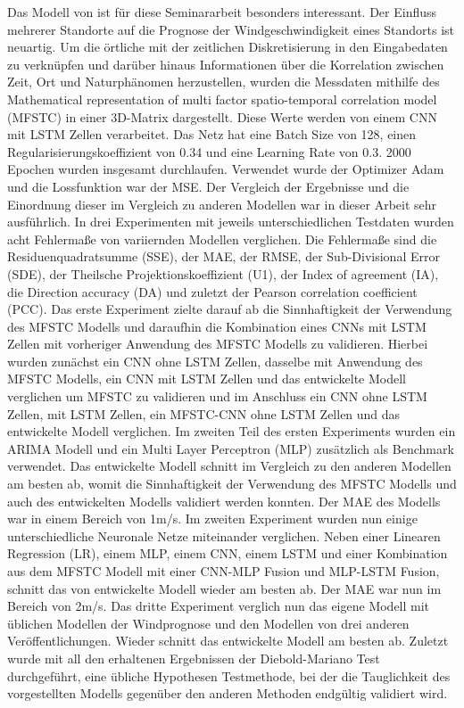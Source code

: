 \documentclass[
12pt, %
toc=listofnumbered, %
toc=chapterentrydotfill, %
numbers=noenddot, %
captions=tableheading, %
bibliography=numbered
]{scrreprt}
\begin{document}
Das Modell von \citeauthor{2019_Chen_MultifactorSpatiotemporalCorrelation} ist für diese Seminararbeit besonders interessant. Der Einfluss mehrerer Standorte auf die Prognose der Windgeschwindigkeit eines Standorts ist neuartig. 
Um die örtliche mit der zeitlichen Diskretisierung in den Eingabedaten zu verknüpfen und darüber hinaus Informationen über die Korrelation zwischen Zeit, Ort und Naturphänomen herzustellen, wurden die Messdaten mithilfe 
des Mathematical representation of multi factor spatio-temporal correlation model (MFSTC) in einer 3D-Matrix dargestellt. Diese Werte werden von einem CNN mit LSTM Zellen verarbeitet. Das Netz hat eine Batch Size von 128, einen 
Regularisierungskoeffizient von 0.34 und eine Learning Rate von 0.3. 2000 Epochen wurden insgesamt durchlaufen. Verwendet wurde der Optimizer Adam und die Lossfunktion war der MSE. Der Vergleich der Ergebnisse und die Einordnung dieser 
im Vergleich zu anderen Modellen war in dieser Arbeit sehr ausführlich. In drei Experimenten mit jeweils unterschiedlichen Testdaten wurden acht Fehlermaße von variiernden Modellen verglichen. Die Fehlermaße sind die Residuenquadratsumme (SSE), 
der MAE, der RMSE, der Sub-Divisional Error (SDE), der Theilsche Projektionskoeffizient (U1), der Index of agreement (IA), die Direction accuracy (DA) und zuletzt der Pearson correlation coefficient (PCC). Das erste Experiment zielte darauf ab 
die Sinnhaftigkeit der Verwendung des MFSTC Modells und daraufhin die Kombination eines CNNs mit LSTM Zellen mit vorheriger Anwendung des MFSTC Modells zu validieren. Hierbei wurden zunächst ein CNN ohne LSTM Zellen, dasselbe mit Anwendung des 
MFSTC Modells, ein CNN mit LSTM Zellen und das entwickelte Modell verglichen um MFSTC zu validieren und im Anschluss ein CNN ohne LSTM Zellen, mit LSTM Zellen, ein MFSTC-CNN ohne LSTM Zellen und das entwickelte Modell verglichen. 
Im zweiten Teil des ersten Experiments wurden ein ARIMA Modell und ein Multi Layer Perceptron (MLP) zusätzlich als Benchmark verwendet. Das entwickelte Modell schnitt im Vergleich zu den anderen Modellen am besten ab, womit die Sinnhaftigkeit der Verwendung des 
MFSTC Modells und auch des entwickelten Modells validiert werden konnten. Der MAE des Modells war in einem Bereich von 1m/s. 
Im zweiten Experiment wurden nun einige unterschiedliche Neuronale Netze miteinander verglichen. Neben einer Linearen Regression (LR), einem MLP, einem CNN, einem LSTM und einer Kombination aus dem MFSTC Modell mit einer CNN-MLP Fusion und MLP-LSTM Fusion, 
schnitt das von \citeauthor{2019_Chen_MultifactorSpatiotemporalCorrelation} entwickelte Modell wieder am besten ab. Der MAE war nun im Bereich von 2m/s. 
Das dritte Experiment verglich nun das eigene Modell mit üblichen Modellen der Windprognose und den Modellen von drei anderen Veröffentlichungen. Wieder schnitt das entwickelte Modell am besten ab. 
Zuletzt wurde mit all den erhaltenen Ergebnissen der Diebold-Mariano Test durchgeführt, eine übliche Hypothesen Testmethode, bei der die Tauglichkeit des vorgestellten Modells gegenüber den anderen Methoden endgültig validiert wird.
\end{document}
